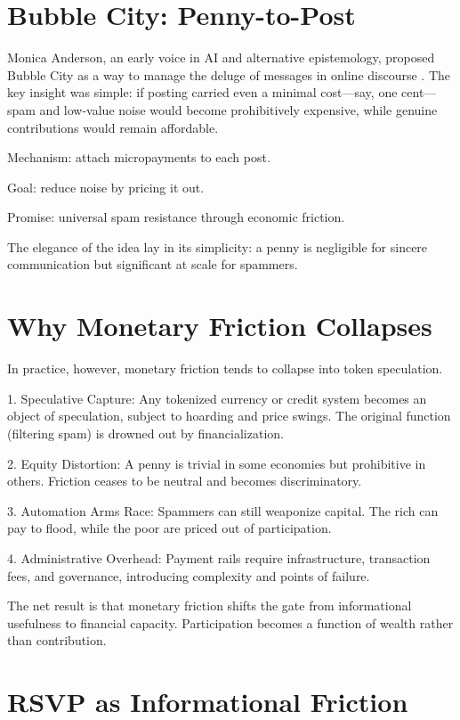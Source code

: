 \documentclass{book}
\begin{document}
\section{Bubble City: Penny-to-Post}

Monica Anderson, an early voice in AI and alternative epistemology, proposed Bubble City as a way to manage the deluge of messages in online discourse \cite{anderson2022}. The key insight was simple: if posting carried even a minimal cost—say, one cent—spam and low-value noise would become prohibitively expensive, while genuine contributions would remain affordable.

Mechanism: attach micropayments to each post.

Goal: reduce noise by pricing it out.

Promise: universal spam resistance through economic friction.

The elegance of the idea lay in its simplicity: a penny is negligible for sincere communication but significant at scale for spammers.

\section{Why Monetary Friction Collapses}

In practice, however, monetary friction tends to collapse into token speculation.

1. Speculative Capture: Any tokenized currency or credit system becomes an object of speculation, subject to hoarding and price swings. The original function (filtering spam) is drowned out by financialization.

2. Equity Distortion: A penny is trivial in some economies but prohibitive in others. Friction ceases to be neutral and becomes discriminatory.

3. Automation Arms Race: Spammers can still weaponize capital. The rich can pay to flood, while the poor are priced out of participation.

4. Administrative Overhead: Payment rails require infrastructure, transaction fees, and governance, introducing complexity and points of failure.

The net result is that monetary friction shifts the gate from informational usefulness to financial capacity. Participation becomes a function of wealth rather than contribution.

\section{RSVP as Informational Friction}
\end{document}
